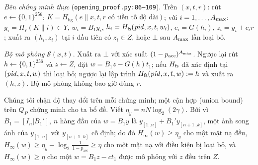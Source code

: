 \emph{Bên chứng minh thực} (\texttt{opening\_proof.py:86--109}). Trên $(x,t,r)$:
rút $e\leftarrow\{0,1\}^{256}$; $K=H_{\mathsf{hg}}(e\|x,t,r\text{ có tiền tố độ dài})$;
với $i=1,\dots,A_{\max}$: $y_i=H_{\mathsf y}(K\|i)\in Y$, $w_i=B_1y_i$,
$h_i=H_{\mathsf{fs}}(\mathit{pid},x,t,w_i)$, $c_i=G(h_i)$, $z_i=y_i+c_ir$; xuất ra $(h_i,z_i)$ tại
$i$ đầu tiên có $z_i\in Z$, hoặc $\bot$ sau $A_{\max}$ lần loại bỏ.

\emph{Bộ mô phỏng} $\mathcal S(x,t)$. Xuất ra $\bot$ với xác suất
$(1-p_{\mathrm{acc}})^{A_{\max}}$. Ngược lại rút $h\leftarrow\{0,1\}^{256}$ và
$z\leftarrow Z$, đặt $w=B_1z-G(h)t_1$; nếu $H_{\mathsf{fs}}$ đã xác định tại
$(\mathit{pid},x,t,w)$ thì loại bỏ; ngược lại lập trình $H_{\mathsf{fs}}(\mathit{pid},x,t,w):=h$ và xuất ra
$(h,z)$. Bộ mô phỏng không bao giờ dùng $r$.

Chúng tôi chặn độ thay đổi trên mỗi chứng minh; một cận hợp (union bound) trên
$Q_P$ chứng minh cho ta bổ đề. Viết $\eta_y=nN\log_2(2\gamma)$. Bởi vì
$B_1=[I_n|B_1']$, $n$ hàng đầu của $w=B_1y$ là $y_{[1..n]}+B_1'y_{[n+1..k]}$,
một ảnh song ánh của $y_{[1..n]}$ với $y_{[n+1..k]}$ cố định; do đó
$H_\infty(w)\ge\eta_y$ cho một mặt nạ đều,
$H_\infty(w)\ge\eta_y-\log_2\frac1{1-p_{\mathrm{acc}}}\ge\eta$ cho một mặt nạ
với điều kiện bị loại bỏ, và $H_\infty(w)\ge\eta$ cho một $w=B_1z-ct_1$ được
mô phỏng với $z$ đều trên $Z$.

